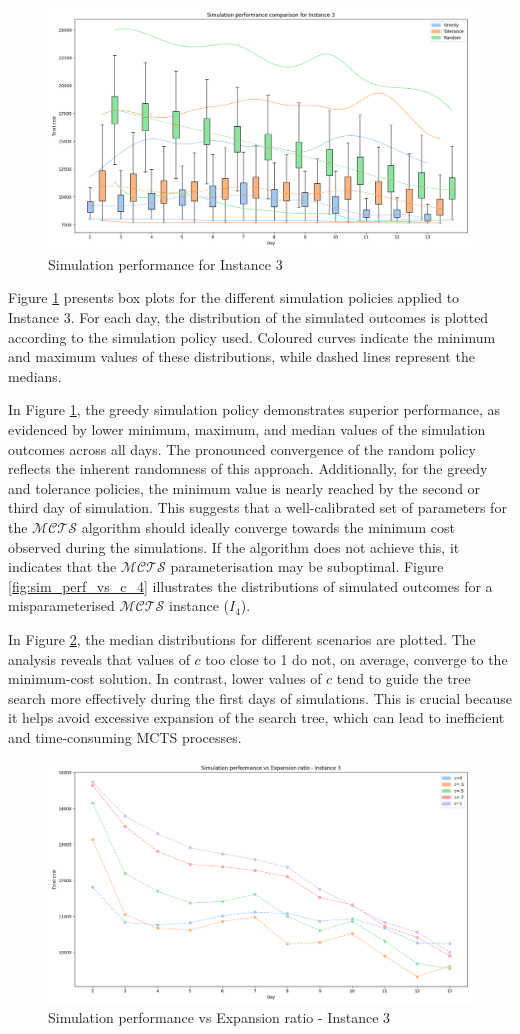 \begin{figure}[!ht]
    \centering
    \includegraphics[width=.4\textwidth]{Figures/3 - Simulation performance.png}
    \caption{Simulation performance for Instance 3}
    \label{fig:sim_perf_3}
\end{figure}

Figure \ref{fig:sim_perf_3} presents box plots for the different simulation policies applied to Instance 3. For each day, the distribution of the simulated outcomes is plotted according to the simulation policy used. Coloured curves indicate the minimum and maximum values of these distributions, while dashed lines represent the medians.

In Figure \ref{fig:sim_perf_3}, the greedy simulation policy demonstrates superior performance, as evidenced by lower minimum, maximum, and median values of the simulation outcomes across all days. The pronounced convergence of the random policy reflects the inherent randomness of this approach. Additionally, for the greedy and tolerance policies, the minimum value is nearly reached by the second or third day of simulation. This suggests that a well-calibrated set of parameters for the $\mathcal{MCTS}$ algorithm should ideally converge towards the minimum cost observed during the simulations. If the algorithm does not achieve this, it indicates that the $\mathcal{MCTS}$ parameterisation may be suboptimal. 
Figure \ref{fig:sim_perf_vs_c_4} illustrates the distributions of simulated outcomes for a misparameterised $\mathcal{MCTS}$ instance ($I_4$). 

In Figure \ref{fig:sim_perf_vs_c_3}, the median distributions for different scenarios are plotted. The analysis reveals that values of $c$ too close to 1 do not, on average, converge to the minimum-cost solution. In contrast, lower values of $c$ tend to guide the tree search more effectively during the first days of simulations. This is crucial because it helps avoid excessive expansion of the search tree, which can lead to inefficient and time-consuming MCTS processes.

\begin{figure}[!ht]
    \centering
    \includegraphics[width=.4\textwidth]{Figures/3 - Simulation performance vs Expansion ratio.png}
    \caption{Simulation performance vs Expansion ratio - Instance 3}
    \label{fig:sim_perf_vs_c_3}
\end{figure}

